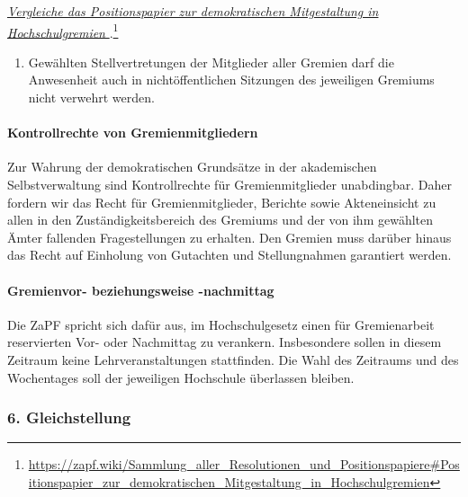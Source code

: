 \documentclass[DIV=calc]{scrartcl}
\begin{document}
\href{https://zapf.wiki/Sammlung_aller_Resolutionen_und_Positionspapiere\#Positionspapier_zur_demokratischen_Mitgestaltung_in_Hochschulgremien}{\emph{Vergleiche das Positionspapier zur demokratischen Mitgestaltung in Hochschulgremien%
  }}.\footnote{\url{https://zapf.wiki/Sammlung_aller_Resolutionen_und_Positionspapiere\#Positionspapier_zur_demokratischen_Mitgestaltung_in_Hochschulgremien}}

\begin{enumerate}
\def\labelenumi{\arabic{enumi})}
\setcounter{enumi}{3}
\item Gewählten Stellvertretungen der Mitglieder aller Gremien darf die Anwesenheit auch in nichtöffentlichen Sitzungen des jeweiligen Gremiums nicht verwehrt werden.
\end{enumerate}

\hypertarget{kontrollrechte-von-gremienmitgliedern}{%
\paragraph{Kontrollrechte von Gremienmitgliedern}\label{kontrollrechte-von-gremienmitgliedern}}

Zur Wahrung der demokratischen Grundsätze in der akademischen Selbstverwaltung sind Kontrollrechte für Gremienmitglieder unabdingbar. Daher fordern wir das Recht für Gremienmitglieder, Berichte sowie Akteneinsicht zu allen in den Zuständigkeitsbereich des Gremiums und der von ihm gewählten Ämter fallenden Fragestellungen zu erhalten. Den Gremien muss darüber hinaus das Recht auf Einholung von Gutachten und Stellungnahmen garantiert werden.

\hypertarget{gremienvor--beziehungsweise--nachmittag}{%
\paragraph{Gremienvor- beziehungsweise -nachmittag}\label{gremienvor--beziehungsweise--nachmittag}}

Die ZaPF spricht sich dafür aus, im Hochschulgesetz einen für
Gremienarbeit reservierten Vor- oder Nachmittag zu verankern.
Insbesondere sollen in diesem Zeitraum keine Lehrveranstaltungen
stattfinden. Die Wahl des Zeitraums und des Wochentages soll der
jeweiligen Hochschule überlassen bleiben.


\hypertarget{gleichstellung}{%
\subsubsection*{6. Gleichstellung}\label{gleichstellung}}
\end{document}
